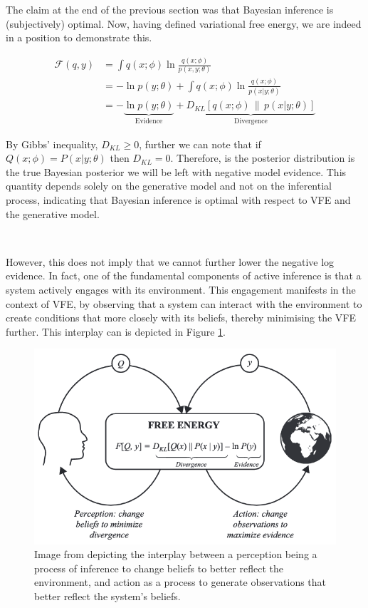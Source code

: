 \documentclass{article}
\begin{document}
The claim at the end of the previous section was that Bayesian inference is (subjectively) optimal. Now, having defined variational free energy, we are indeed in a position to demonstrate this.

\begin{equation}\label{eq:vfe_low_road}
	\begin{aligned}
		\mathcal{F}(q, y) &=  \int q(x; \phi) \ln \frac{q(x; \phi)}{p(x, y; \theta)} \\
		&= - \ln p(y; \theta) + \int q(x; \phi) \ln \frac{q(x; \phi)}{p(x | y; \theta)} \\ 
		&= - \underbrace{\ln p(y; \theta)}_{\text{Evidence}} + \underbrace{D_{KL}\left[ q(x; \phi) \,\|\, p(x | y; \theta) \right]}_{\text{Divergence}}
	\end{aligned}
\end{equation}

By Gibbs' inequality, $D_{KL} \geq 0 $, further we can note that if $Q(x; \phi) = P(x | y; \theta)$ then $D_{KL} = 0$. Therefore, is the posterior distribution is the true Bayesian posterior we will be left with negative model evidence. This quantity depends solely on the generative model and not on the inferential process, indicating that Bayesian inference is optimal with respect to VFE and the generative model.

\

However, this does not imply that we cannot further lower the negative log evidence. In fact, one of the fundamental components of active inference is that a system actively engages with its environment. This engagement manifests in the context of VFE, by observing that a system can interact with the environment to create conditions that more closely with its beliefs, thereby minimising the VFE further. This interplay can is depicted in Figure \ref{fig:vfe_minimisation}. 

\begin{figure}[htbp]
    \centering
    \includegraphics[scale=0.55]{images/vfe_minimisation.png}
    \caption{Image from \citet{parr2022ActiveInference} depicting the interplay between a perception being a process of inference to change beliefs to better reflect the environment, and action as a process to generate observations that better reflect the system's beliefs.}
    \label{fig:vfe_minimisation}
\end{figure}
\end{document}
